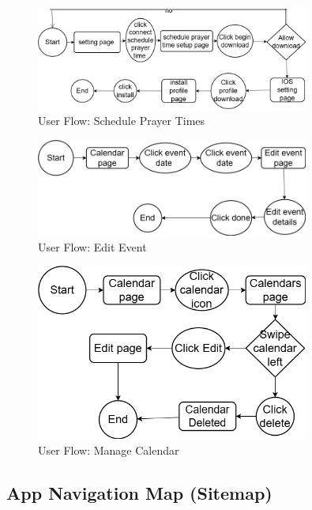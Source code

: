 \begin{figure}[H]
    \centering
    \includegraphics[width=0.8\textwidth]{images/schedual prayer.drawio.png}
    \caption{User Flow: Schedule Prayer Times}
    \label{fig:userflow-schedule-prayer}
\end{figure}

\begin{figure}[H]
    \centering
    \includegraphics[width=0.8\textwidth]{images/Edit event.drawio.png}
    \caption{User Flow: Edit Event}
    \label{fig:userflow-edit-event}
\end{figure}

\begin{figure}[H]
    \centering
    \includegraphics[width=0.8\textwidth]{images/Manage calendar.drawio.png}
    \caption{User Flow: Manage Calendar}
    \label{fig:userflow-manage-calendar}
\end{figure}

\subsection{App Navigation Map (Sitemap)}

